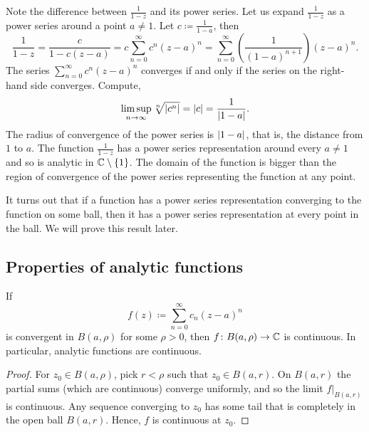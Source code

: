 \begin{example}
Note the difference between $\frac{1}{1-z}$ and its power series.  Let us
expand $\frac{1}{1-z}$ as a power series around a point $a \neq 1$.
Let $c \coloneqq \frac{1}{1-a}$, then
\begin{equation*}
\frac{1}{1-z} = 
\frac{c}{1-c(z-a)}
=
c
\sum_{n=0}^\infty c^{n} {(z-a)}^n
=
\sum_{n=0}^\infty \left( \frac{1}{{(1-a)}^{n+1}} \right) {(z-a)}^n .
\end{equation*}
The series $\sum_{n=0}^\infty c^n {(z-a)}^n$ converges if and only if 
the series on the right-hand side converges.  Compute,
\begin{equation*}
\limsup_{n\to\infty}
\sqrt[n]{\lvert {c^n} \rvert} = \lvert {c} \rvert
= \frac{1}{\lvert {1-a} \rvert} .
\end{equation*}
The radius of convergence of the power series is $\lvert {1-a} \rvert$, that is, the
distance from $1$ to $a$.  The function $\frac{1}{1-z}$
has a power series
representation around every $a \neq 1$ and so is analytic in ${\mathbb{C}} \setminus
\{ 1 \}$.
The domain of the function is bigger than the region
of convergence of the power series representing the function at any point.
\end{example}

It turns out that 
if a function has a power series representation converging to the function
on some ball,
then it has a power series representation at every point in the ball.  We will prove this
result later.

\subsection{Properties of analytic functions}

\begin{prop}
If
\begin{equation*}
f(z) \coloneqq \sum_{n=0}^\infty c_n {(z-a)}^n
\end{equation*}
is convergent in $B(a,\rho)$ for some $\rho > 0$, then
$f \colon B(a,\rho) \to {\mathbb{C}}$ is continuous.
In particular, analytic functions are continuous.
\end{prop}

\begin{proof}
For $z_0 \in B(a,\rho)$, pick $r < \rho$ such that $z_0 \in B(a,r)$.
On $B(a,r)$ the
partial sums (which are continuous) converge uniformly,
and so the limit $f|_{B(a,r)}$ is continuous.
Any sequence converging to
$z_0$ has some tail that is completely in the open ball $B(a,r)$.
Hence, $f$ is continuous at $z_0$.
\end{proof}

